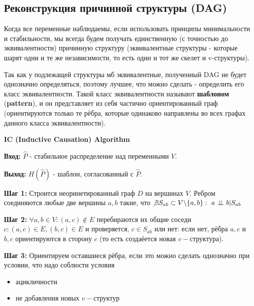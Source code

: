 \documentclass[fleqn]{article}
\newcommand{\independent}{\perp \!\!\! \perp}
\begin{document}
\subsection*{Реконструкция причинной структуры (DAG)}

Когда все переменные наблюдаемы, если использовать принципы минимальности и стабильности, мы всегда будем получать единственную (с точностью до эквивалентности) причинную структуру (эквивалентные структуры - которые шарят одни и те же независимости, то есть один и тот же скелет и v-структуры).

Так как у подлежащей структуры мб эквивалентные, полученный DAG не будет однозначно определяться, поэтому лучшее, что можно сделать - определить его класс эквивалентности. Такой класс эквивалентности называют \textbf{шаблоном} (\textbf{pattern}), и он представляет из себя частично ориентированный граф (ориентируются только те рёбра, которые одинаково направлены во всех графах данного класса эквивалентности).

\textbf{IC (Inductive Causation) Algorithm}

\textbf{Вход:} $\hat P$ - стабильное распределение над переменными $V$.

\textbf{Выход:} $H(\hat P)$ - шаблон, согласованный с $\hat P$.

\textbf{Шаг 1:} Строится неоринетированный граф $D$ на вершинах $V$. Ребром соединяются любые две вершины $a, b$ такие, что $\not\exists S_{ab} \subset V \backslash \{a,b\}:\ a \independent b | S_{ab}$ 

\textbf{Шаг 2:}  $\forall a, b \in V: (a,c) \not \in E$ перебираются их общие соседи $c: (a,c)\in E,  (b,c) \in E$ и проверяется, $c \in S_{ab}$ или нет: если нет, рёбра $a,c$ и $b,c$ ориентируются в сторону $c$ (то есть создаёется новая $v-$структура).

\textbf{Шаг 3:} Ориентируем оставшиеся рёбра, если это можно сделать однозначно при условии, что надо соблюсти условия \begin{itemize}
	\item ацикличности
	\item не добавления новых $v-$структур
\end{itemize}
\end{document}
